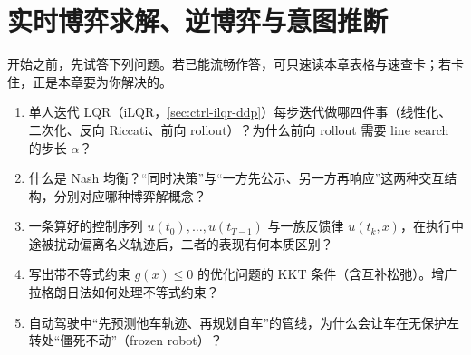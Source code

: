 \chapter{实时博弈求解、逆博弈与意图推断}
\label{ch:plan-rtgame}



\begin{practice}[前置自测]
开始之前，先试答下列问题。若已能流畅作答，可只速读本章表格与速查卡；若卡住，正是本章要为你解决的。
\begin{enumerate}
  \item 单人迭代 LQR（iLQR，\cref{sec:ctrl-ilqr-ddp}）每步迭代做哪四件事（线性化、二次化、反向 Riccati、前向 rollout）？为什么前向 rollout 需要 line search 的步长 $\alpha$？
  \item 什么是 Nash 均衡？“同时决策”与“一方先公示、另一方再响应”这两种交互结构，分别对应哪种博弈解概念？
  \item 一条算好的控制序列 $u(t_0),\dots,u(t_{T-1})$ 与一族反馈律 $u(t_k,x)$，在执行中途被扰动偏离名义轨迹后，二者的表现有何本质区别？
  \item 写出带不等式约束 $g(x)\le0$ 的优化问题的 KKT 条件（含互补松弛）。增广拉格朗日法如何处理不等式约束？
  \item 自动驾驶中“先预测他车轨迹、再规划自车”的管线，为什么会让车在无保护左转处“僵死不动”（frozen robot）？
\end{enumerate}
\end{practice}

